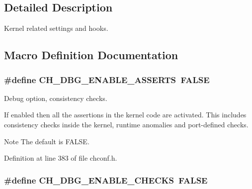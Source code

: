 \subsection{Detailed Description}
Kernel related settings and hooks. 

\subsection{Macro Definition Documentation}
\hypertarget{group__config_gad602fd2546073869a10859158d865b9b}{}
\subsubsection[{C\+H\+\_\+\+D\+B\+G\+\_\+\+E\+N\+A\+B\+L\+E\+\_\+\+A\+S\+S\+E\+R\+T\+S}]{\setlength{\rightskip}{0pt plus 5cm}\#define C\+H\+\_\+\+D\+B\+G\+\_\+\+E\+N\+A\+B\+L\+E\+\_\+\+A\+S\+S\+E\+R\+T\+S~F\+A\+L\+S\+E}\label{group__config_gad602fd2546073869a10859158d865b9b}


Debug option, consistency checks. 

If enabled then all the assertions in the kernel code are activated. This includes consistency checks inside the kernel, runtime anomalies and port-\/defined checks.

\begin{DoxyNote}{Note}
The default is {\ttfamily F\+A\+L\+S\+E}. 
\end{DoxyNote}


Definition at line 383 of file chconf.\+h.

\hypertarget{group__config_gaef984ca3bfd8a71478ad55ce6e56a8bb}{}
\subsubsection[{C\+H\+\_\+\+D\+B\+G\+\_\+\+E\+N\+A\+B\+L\+E\+\_\+\+C\+H\+E\+C\+K\+S}]{\setlength{\rightskip}{0pt plus 5cm}\#define C\+H\+\_\+\+D\+B\+G\+\_\+\+E\+N\+A\+B\+L\+E\+\_\+\+C\+H\+E\+C\+K\+S~F\+A\+L\+S\+E}\label{group__config_gaef984ca3bfd8a71478ad55ce6e56a8bb}


